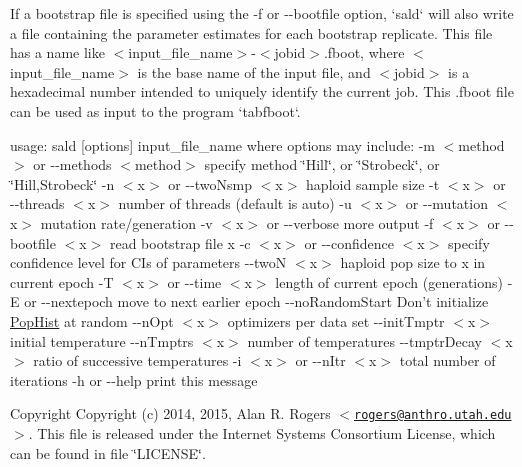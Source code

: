 \-If a bootstrap file is specified using the -\/f or -\/-\/bootfile option, `sald` will also write a file containing the parameter estimates for each bootstrap replicate. \-This file has a name like $<$input\-\_\-file\-\_\-name$>$-\/$<$jobid$>$.fboot, where $<$input\-\_\-file\-\_\-name$>$ is the base name of the input file, and $<$jobid$>$ is a hexadecimal number intended to uniquely identify the current job. \-This .fboot file can be used as input to the program `tabfboot`.

usage\-: sald \mbox{[}options\mbox{]} input\-\_\-file\-\_\-name where options may include\-: -\/m $<$method$>$ or -\/-\/methods $<$method$>$ specify method \char`\"{}\-Hill\char`\"{}, or \char`\"{}\-Strobeck\char`\"{}, or \char`\"{}\-Hill,\-Strobeck\char`\"{} -\/n $<$x$>$ or -\/-\/two\-Nsmp $<$x$>$ haploid sample size -\/t $<$x$>$ or -\/-\/threads $<$x$>$ number of threads (default is auto) -\/u $<$x$>$ or -\/-\/mutation $<$x$>$ mutation rate/generation -\/v $<$x$>$ or -\/-\/verbose more output -\/f $<$x$>$ or -\/-\/bootfile $<$x$>$ read bootstrap file x -\/c $<$x$>$ or -\/-\/confidence $<$x$>$ specify confidence level for \-C\-Is of parameters -\/-\/two\-N $<$x$>$ haploid pop size to x in current epoch -\/\-T $<$x$>$ or -\/-\/time $<$x$>$ length of current epoch (generations) -\/\-E or -\/-\/nextepoch move to next earlier epoch -\/-\/no\-Random\-Start \-Don't initialize \hyperlink{struct_pop_hist}{\-Pop\-Hist} at random -\/-\/n\-Opt $<$x$>$ optimizers per data set -\/-\/init\-Tmptr $<$x$>$ initial temperature -\/-\/n\-Tmptrs $<$x$>$ number of temperatures -\/-\/tmptr\-Decay $<$x$>$ ratio of successive temperatures -\/i $<$x$>$ or -\/-\/n\-Itr $<$x$>$ total number of iterations -\/h or -\/-\/help print this message

\begin{DoxyCopyright}{\-Copyright}
\-Copyright (c) 2014, 2015, \-Alan \-R. \-Rogers $<$\href{mailto:rogers@anthro.utah.edu}{\tt rogers@anthro.\-utah.\-edu}$>$. \-This file is released under the \-Internet \-Systems \-Consortium \-License, which can be found in file \char`\"{}\-L\-I\-C\-E\-N\-S\-E\char`\"{}. 
\end{DoxyCopyright}
